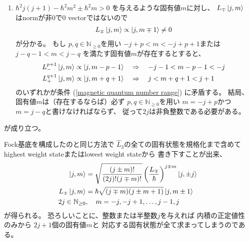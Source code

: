 \begin{enumerate}
{    }
    \item{
        $\hbar^2 j (j+1) - \hbar^2 m^2 \pm \hbar^2 m > 0$
        を与えるような固有値$m$に対し、
        $ L_\mp \ket{ j, m } $
        はnormが非0で$0$ vectorではないので
        \begin{align}
            L_\mp \ket{ j, m } \propto \ket{ j, m \mp 1 } \neq 0
        \end{align}
        が分かる。
        もし
        $p, q \in \mathbb{N}_{\ge0}$を用い
        $- j + p < m < - j + p + 1$または
        $j - q - 1 < m < j - q$
        を満たす固有値$m$が存在するとすると、
        \begin{subequations}
        \begin{align}
            L_-^{p+1} \ket{ j, m }
            \propto \ket{ j, m - p - 1}
        \quad&\Rightarrow\quad
            - j - 1 < m - p - 1 < -j
        \\
            L_+^{q+1} \ket{ j, m }
            \propto \ket{ j, m + q + 1}
        \quad&\Rightarrow\quad
            j < m + q + 1 < j + 1
        \end{align}
        \end{subequations}
        のいずれかが条件
        (\ref{magnetic quantum number range})
        に矛盾する。
        結局、固有値$m$は（存在するならば）必ず
        $p, q \in \mathbb{N}_{\ge0}$を用い
        $m = - j + p$かつ$ m = j - q$と書けなければならず、
        従って$ 2j $は非負整数である必要がある。
    }
\end{enumerate}
が成り立つ。

Fock基底を構成したのと同じ方法で
$\hat{L}_3$の全ての固有状態を規格化まで含めて
highest weight stateまたはlowest weight stateから
書き下すことが出来、
\begin{subequations}
\begin{align}
    \ket{ j, m }
    &=
    \sqrt{\dfrac{
        (j \pm m)!
    }{
        (2j)! (j \mp m)!
    }}
    \left(
        \dfrac{L_\mp}{\hbar}
    \right)^{j \mp m}
    \ket{ j, \pm j }
\\
    L_\pm \ket{ j, m }
    &= \hbar
    \sqrt{(j \mp m)(j \pm m + 1)}
    \ket{ j, m \pm 1 }
\\
    2j \in \mathbb{N}_{\ge0}
    &,\quad
    m = - j, - j + 1, \dots, j - 1, j
\end{align}
\end{subequations}
が得られる。
恐ろしいことに、整数または半整数$j$を与えれば
内積の正定値性のみから
$2j +1$個の固有値$m$と
対応する固有状態が全て求まってしまうのである。

